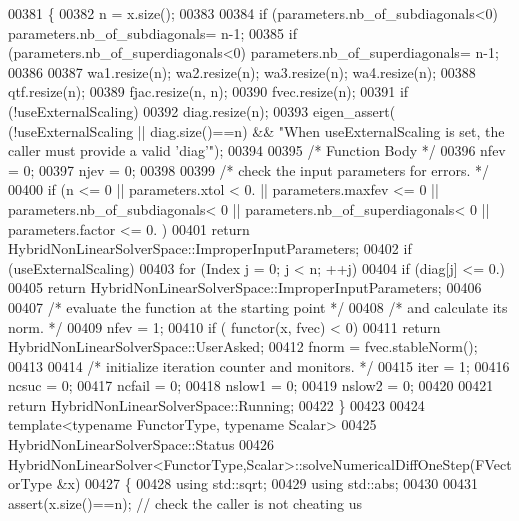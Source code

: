 \begin{DoxyCode}
00381 \{
00382     n = x.size();
00383 
00384     \textcolor{keywordflow}{if} (parameters.nb\_of\_subdiagonals<0) parameters.nb\_of\_subdiagonals= n-1;
00385     \textcolor{keywordflow}{if} (parameters.nb\_of\_superdiagonals<0) parameters.nb\_of\_superdiagonals= n-1;
00386 
00387     wa1.resize(n); wa2.resize(n); wa3.resize(n); wa4.resize(n);
00388     qtf.resize(n);
00389     fjac.resize(n, n);
00390     fvec.resize(n);
00391     \textcolor{keywordflow}{if} (!useExternalScaling)
00392         diag.resize(n);
00393     eigen\_assert( (!useExternalScaling || diag.size()==n) && \textcolor{stringliteral}{"When useExternalScaling is set, the caller
       must provide a valid 'diag'"});
00394 
00395     \textcolor{comment}{/* Function Body */}
00396     nfev = 0;
00397     njev = 0;
00398 
00399     \textcolor{comment}{/*     check the input parameters for errors. */}
00400     \textcolor{keywordflow}{if} (n <= 0 || parameters.xtol < 0. || parameters.maxfev <= 0 || parameters.nb\_of\_subdiagonals< 0 || 
      parameters.nb\_of\_superdiagonals< 0 || parameters.factor <= 0. )
00401         \textcolor{keywordflow}{return} HybridNonLinearSolverSpace::ImproperInputParameters;
00402     \textcolor{keywordflow}{if} (useExternalScaling)
00403         \textcolor{keywordflow}{for} (Index j = 0; j < n; ++j)
00404             \textcolor{keywordflow}{if} (diag[j] <= 0.)
00405                 \textcolor{keywordflow}{return} HybridNonLinearSolverSpace::ImproperInputParameters;
00406 
00407     \textcolor{comment}{/*     evaluate the function at the starting point */}
00408     \textcolor{comment}{/*     and calculate its norm. */}
00409     nfev = 1;
00410     \textcolor{keywordflow}{if} ( functor(x, fvec) < 0)
00411         \textcolor{keywordflow}{return} HybridNonLinearSolverSpace::UserAsked;
00412     fnorm = fvec.stableNorm();
00413 
00414     \textcolor{comment}{/*     initialize iteration counter and monitors. */}
00415     iter = 1;
00416     ncsuc = 0;
00417     ncfail = 0;
00418     nslow1 = 0;
00419     nslow2 = 0;
00420 
00421     \textcolor{keywordflow}{return} HybridNonLinearSolverSpace::Running;
00422 \}
00423 
00424 \textcolor{keyword}{template}<\textcolor{keyword}{typename} FunctorType, \textcolor{keyword}{typename} Scalar>
00425 HybridNonLinearSolverSpace::Status
00426 HybridNonLinearSolver<FunctorType,Scalar>::solveNumericalDiffOneStep(FVectorType  &x)
00427 \{
00428     \textcolor{keyword}{using} std::sqrt;
00429     \textcolor{keyword}{using} std::abs;
00430     
00431     assert(x.size()==n); \textcolor{comment}{// check the caller is not cheating us}

\end{DoxyCode}

